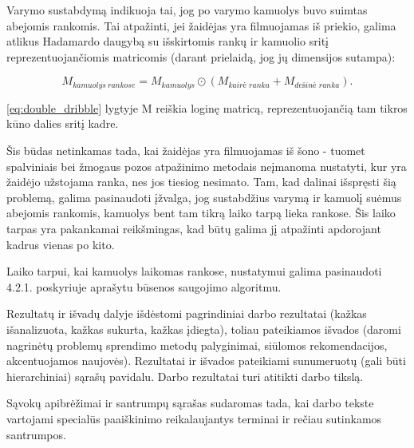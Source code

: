\documentclass{VUMIFPSbakalaurinis}
\begin{document}
Varymo sustabdymą indikuoja tai, jog po varymo kamuolys buvo suimtas abejomis rankomis. Tai atpažinti, jei žaidėjas yra filmuojamas iš priekio, galima atlikus Hadamardo daugybą su išskirtomis rankų ir kamuolio sritį reprezentuojančiomis matricomis (darant prielaidą, jog jų dimensijos sutampa):

\begin{equation}\label{eq:double_dribble}
	M_{kamuolys\ rankose} = M_{kamuolys} \odot (M_{\textit{kairė\ ranka}} + M_{\textit{dešinė\ ranka}}).
\end{equation}

\ref{eq:double_dribble} lygtyje M reiškia loginę matricą, reprezentuojančią tam tikros kūno dalies sritį kadre. 

Šis būdas netinkamas tada, kai žaidėjas yra filmuojamas iš šono - tuomet spalviniais bei žmogaus pozos atpažinimo metodais neįmanoma nustatyti, kur yra žaidėjo užstojama ranka, nes jos tiesiog nesimato. Tam, kad dalinai išspręsti šią problemą, galima pasinaudoti įžvalga, jog sustabdžius varymą ir kamuolį suėmus abejomis rankomis, kamuolys bent tam tikrą laiko tarpą lieka rankose. Šis laiko tarpas yra pakankamai reikšmingas, kad būtų galima jį atpažinti apdorojant kadrus vienas po kito. 

Laiko tarpui, kai kamuolys laikomas rankose, nustatymui galima pasinaudoti 4.2.1. poskyriuje aprašytu būsenos saugojimo algoritmu. 

Rezultatų ir išvadų dalyje išdėstomi pagrindiniai darbo rezultatai (kažkas
išanalizuota, kažkas sukurta, kažkas įdiegta), toliau pateikiamos išvados
(daromi nagrinėtų problemų sprendimo metodų palyginimai, siūlomos
rekomendacijos, akcentuojamos naujovės). Rezultatai ir išvados pateikiami
sunumeruotų (gali būti hierarchiniai) sąrašų pavidalu. Darbo rezultatai turi
atitikti darbo tikslą.

\printbibliography[heading=bibintoc]  %

Sąvokų apibrėžimai ir santrumpų sąrašas sudaromas tada, kai darbo tekste
vartojami specialūs paaiškinimo reikalaujantys terminai ir rečiau sutinkamos
santrumpos.
\end{document}
